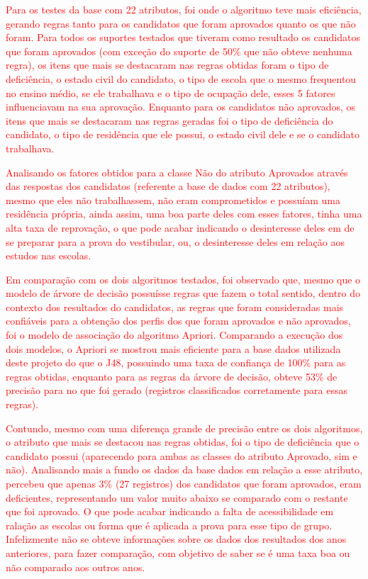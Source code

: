 \par
\textcolor{red}{Para os testes da base com 22 atributos, foi onde o algoritmo teve mais eficiência, gerando regras tanto para os candidatos que foram aprovados quanto os que não foram. Para todos os suportes testados que tiveram como resultado os candidatos que foram aprovados (com exceção do suporte de 50\% que não obteve nenhuma regra), os itens que mais se destacaram nas regras obtidas foram o tipo de deficiência, o estado civil do candidato, o tipo de escola que o mesmo frequentou no ensino médio, se ele trabalhava e o tipo de ocupação dele, esses 5 fatores influenciavam na sua aprovação. Enquanto para os candidatos não aprovados, os itens que mais se destacaram nas regras geradas foi o tipo de deficiência do candidato, o tipo de residência que ele possui, o estado civil dele e se o candidato trabalhava.}

\par
\textcolor{red}{Analisando os fatores obtidos para a classe Não do atributo Aprovados através das respostas dos candidatos (referente a base de dados com 22 atributos), mesmo que eles não trabalhassem, não eram comprometidos e possuíam uma residência própria, ainda assim, uma boa parte deles com esses fatores, tinha uma alta taxa de reprovação, o que pode acabar indicando o desinteresse deles em de se preparar para a prova do vestibular, ou, o desinteresse deles em relação aos estudos nas escolas.}

\par
\textcolor{red}{Em comparação com os dois algoritmos testados, foi observado que, mesmo que o modelo de árvore de decisão possuísse regras que fazem o total sentido, dentro do contexto dos resultados do candidatos, as regras que foram consideradas mais confiáveis para a obtenção dos perfis dos que foram aprovados e não aprovados, foi o modelo de associação do algoritmo Apriori. Comparando a execução dos dois modelos, o Apriori se mostrou mais eficiente para a base dados utilizada deste projeto do que o J48, possuindo uma taxa de confiança de 100\% para as regras obtidas, enquanto para as regras da árvore de decisão, obteve 53\% de precisão para no que foi gerado (registros classificados corretamente para essas regras).}

\textcolor{red}{Contundo, mesmo com uma diferença grande de precisão entre os dois algoritmos, o atributo que mais se destacou nas regras obtidas, foi o tipo de deficiência que o candidato possui (aparecendo para ambas as classes do atributo Aprovado, sim e não). Analisando mais a fundo os dados da base dados em relação a esse atributo, percebeu que apenas 3\% (27 registros) dos candidatos que foram aprovados, eram deficientes, representando um valor muito abaixo se comparado com o restante que foi aprovado. O que pode acabar indicando a falta de acessibilidade em ralação as escolas ou forma que é aplicada a prova para esse tipo de grupo. Infelizmente não se obteve informações sobre os dados dos resultados dos anos anteriores, para fazer comparação, com objetivo de saber se é uma taxa boa ou não comparado aos outros anos.}
